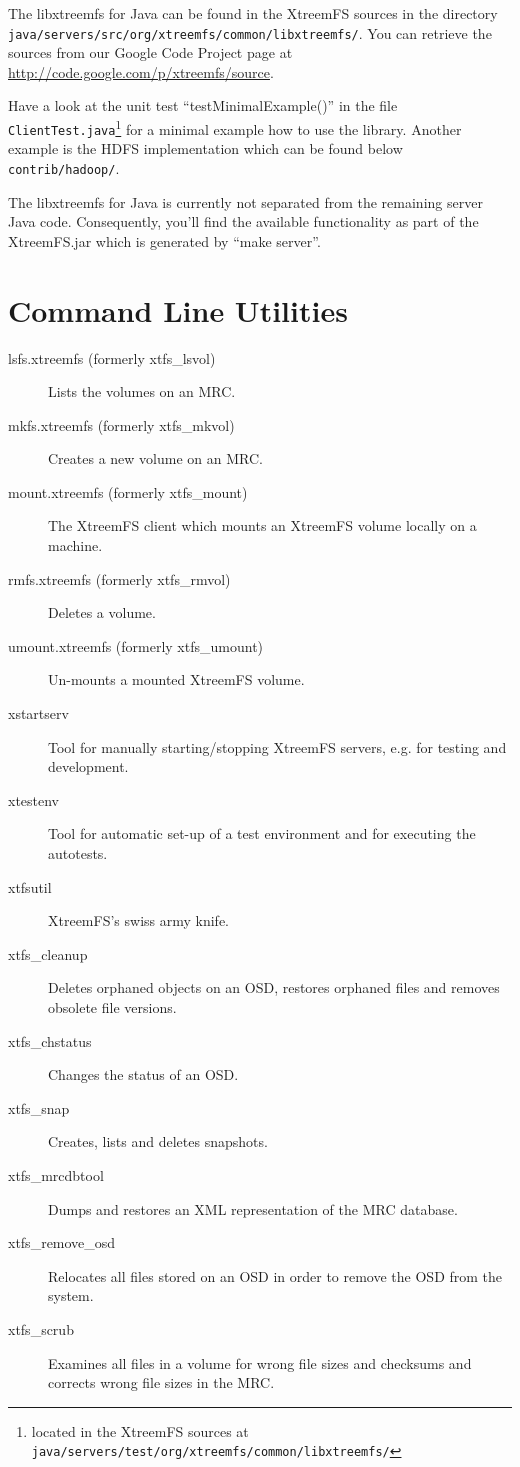 \documentclass[a4paper,10pt]{book}
\begin{document}
The libxtreemfs for Java can be found in the XtreemFS sources in the directory \texttt{java/servers/src/org/xtreemfs/common/libxtreemfs/}. You can retrieve the sources from our Google Code Project page at \url{http://code.google.com/p/xtreemfs/source}.

Have a look at the unit test ``testMinimalExample()'' in the file \texttt{ClientTest.java}\footnote{located in the XtreemFS sources at \texttt{java/servers/test/org/xtreemfs/common/libxtreemfs/}} for a minimal example how to use the library. Another example is the HDFS implementation which can be found below \texttt{contrib/hadoop/}.

The libxtreemfs for Java is currently not separated from the remaining server Java code. Consequently, you'll find the available functionality as part of the XtreemFS.jar which is generated by ``make server''. 

\chapter{Command Line Utilities}
\label{sec:cli_utils}

\begin{description}
 \item[lsfs.xtreemfs (formerly xtfs\_lsvol)] Lists the volumes on an MRC.
 \item[mkfs.xtreemfs (formerly xtfs\_mkvol)] Creates a new volume on an MRC.
 \item[mount.xtreemfs (formerly xtfs\_mount)] The XtreemFS client which mounts an XtreemFS volume locally on a machine.
 \item[rmfs.xtreemfs (formerly xtfs\_rmvol)] Deletes a volume.
 \item[umount.xtreemfs (formerly xtfs\_umount)] Un-mounts a mounted XtreemFS volume.
 \item[xstartserv] Tool for manually starting/stopping XtreemFS servers, e.g. for testing and development.
 \item[xtestenv] Tool for automatic set-up of a test environment and for executing the autotests.
 \item[xtfsutil] XtreemFS's swiss army knife.
 \item[xtfs\_cleanup] Deletes orphaned objects on an OSD, restores orphaned files and removes obsolete file versions.
 \item[xtfs\_chstatus] Changes the status of an OSD.
 \item[xtfs\_snap] Creates, lists and deletes snapshots.
 \item[xtfs\_mrcdbtool] Dumps and restores an XML representation of the MRC database.
 \item[xtfs\_remove\_osd] Relocates all files stored on an OSD in order to remove the OSD from the system.
 \item[xtfs\_scrub] Examines all files in a volume for wrong file sizes and checksums and corrects wrong file sizes in the MRC.
\end{description}

\printindex
\end{document}
